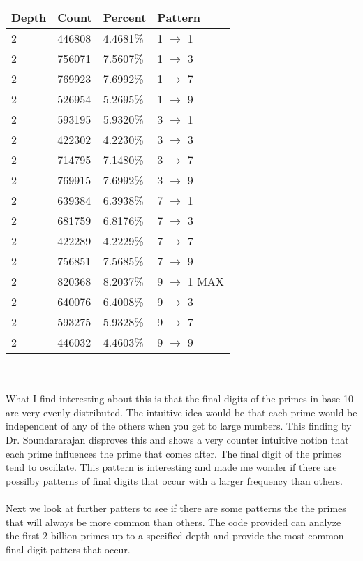 \documentclass[13pt]{article}
\begin{document}
\begin{tabular} { l l l l }
Depth & Count      & Percent   & Pattern\\
\hline
    2 &     446808 &   4.4681\% & 1 $\rightarrow$ 1\\
    2 &     756071 &   7.5607\% & 1 $\rightarrow$ 3\\
    2 &     769923 &   7.6992\% & 1 $\rightarrow$ 7\\
    2 &     526954 &   5.2695\% & 1 $\rightarrow$ 9\\
    2 &     593195 &   5.9320\% & 3 $\rightarrow$ 1\\
    2 &     422302 &   4.2230\% & 3 $\rightarrow$ 3\\
    2 &     714795 &   7.1480\% & 3 $\rightarrow$ 7\\
    2 &     769915 &   7.6992\% & 3 $\rightarrow$ 9\\
    2 &     639384 &   6.3938\% & 7 $\rightarrow$ 1\\
    2 &     681759 &   6.8176\% & 7 $\rightarrow$ 3\\
    2 &     422289 &   4.2229\% & 7 $\rightarrow$ 7\\
    2 &     756851 &   7.5685\% & 7 $\rightarrow$ 9\\
    2 &     820368 &   8.2037\% & 9 $\rightarrow$ 1 MAX \\  
    2 &     640076 &   6.4008\% & 9 $\rightarrow$ 3\\
    2 &     593275 &   5.9328\% & 9 $\rightarrow$ 7\\
    2 &     446032 &   4.4603\% & 9 $\rightarrow$ 9\\
\end{tabular}\\\\
What I find interesting about this is that the final digits of the primes in base 10 are very evenly distributed. The intuitive idea would be that each prime would be independent of any of the others when you get to large numbers. This finding by Dr. Soundararajan disproves this and shows a very counter intuitive notion that each prime influences the prime that comes after. The final digit of the primes tend to oscillate. This pattern is interesting and made me wonder if there are possilby patterns of final digits that occur with a larger frequency than others.
\\\\\indent
Next we look at further patters to see if there are some patterns the the primes that will always be more common than others.
The code provided can analyze the first 2 billion primes up to a specified depth and provide the most common final digit patters that occur.
\end{document}
